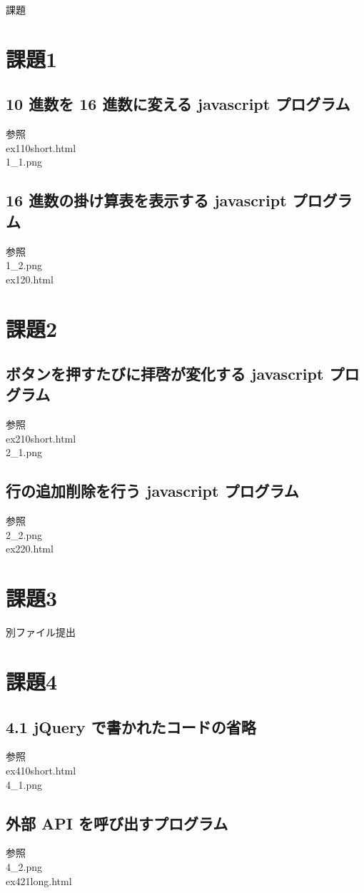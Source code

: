 \documentclass[a4j]{jarticle}
\begin{document}
{\rm \huge 課題}
  \section{課題1}
    \subsection{ 10 進数を 16 進数に変える javascript プログラム}
      参照\\
      ex110short.html\\
      1\_1.png
    \subsection{16 進数の掛け算表を表示する javascript プログラム}
      参照\\
      1\_2.png\\
      ex120.html
  \section{課題2}
    \subsection{ボタンを押すたびに拝啓が変化する javascript プログラム}
      参照\\
      ex210short.html\\
      2\_1.png
    \subsection{行の追加削除を行う javascript プログラム}
        参照\\
      2\_2.png\\
      ex220.html
  \section{課題3}
    別ファイル提出
  \section{課題4}
    \subsection{4.1 jQuery で書かれたコードの省略}
      参照\\
      ex410short.html\\
      4\_1.png
    \subsection{外部 API を呼び出すプログラム}
      参照\\
      4\_2.png\\
      ex421long.html
\end{document}

